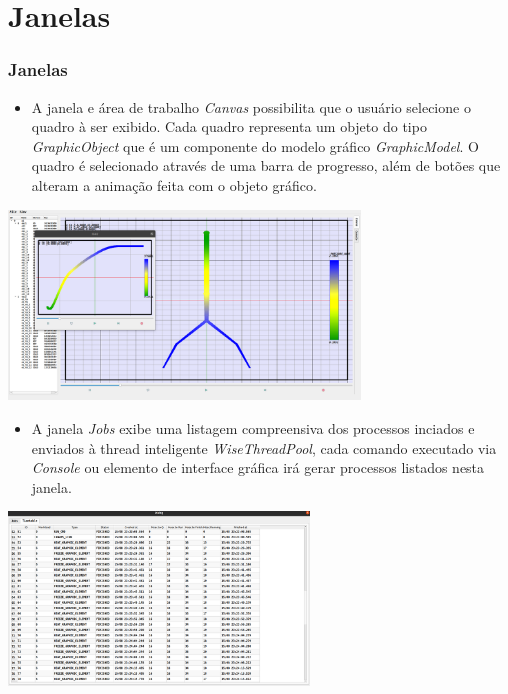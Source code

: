 \documentclass[10pt,aspectratio=169]{beamer}
\theoremstyle{remark}
\theoremstyle{definition}
\begin{document}
\section{Janelas}
\begin{frame}[allowframebreaks]
\frametitle{Janelas}
	
	\begin{itemize}
		\item A janela e área de trabalho \textit{Canvas} possibilita que o usuário selecione o quadro à ser exibido. Cada quadro representa um objeto do tipo \textit{GraphicObject} que é um componente do modelo gráfico \textit{GraphicModel}. O quadro é selecionado através de uma barra de progresso, além de botões que alteram a animação feita com o objeto gráfico.
	\end{itemize}		
	
	\begin{center}
		
		\item \includegraphics[width=0.7\textwidth]{Figures/IGU_025.png}
		
	\end{center}

	\framebreak
	
	\begin{itemize}
	\item A janela \textit{Jobs} exibe uma listagem compreensiva dos processos inciados e enviados à thread inteligente \textit{WiseThreadPool}, cada comando executado via \textit{Console} ou elemento de interface gráfica irá gerar processos listados nesta janela.
	
	\end{itemize}		
	
	\begin{center}
	
	\item \includegraphics[width=0.6\textwidth]{Figures/IGU_023.png}
	

\end{center}
\end{frame}
\end{document}
